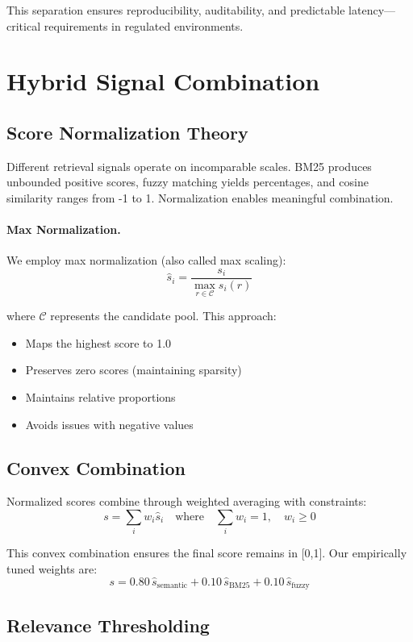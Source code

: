 This separation ensures reproducibility, auditability, and predictable latency—critical requirements in regulated environments.

\section{Hybrid Signal Combination}

\subsection{Score Normalization Theory}

Different retrieval signals operate on incomparable scales. BM25 produces unbounded positive scores, fuzzy matching yields percentages, and cosine similarity ranges from -1 to 1. Normalization enables meaningful combination.

\paragraph{Max Normalization.} We employ max normalization (also called max scaling):
\[
\widehat{s}_i = \frac{s_i}{\max_{r \in \mathcal{C}} s_i(r)}
\]

where $\mathcal{C}$ represents the candidate pool. This approach:
\begin{itemize}[leftmargin=*,itemsep=2pt,topsep=2pt]
\item Maps the highest score to 1.0
\item Preserves zero scores (maintaining sparsity)
\item Maintains relative proportions
\item Avoids issues with negative values
\end{itemize}

\subsection{Convex Combination}

Normalized scores combine through weighted averaging with constraints:
\[
s = \sum_{i} w_i \widehat{s}_i \quad \text{where} \quad \sum_{i} w_i = 1, \quad w_i \geq 0
\]

This convex combination ensures the final score remains in [0,1]. Our empirically tuned weights are:
\[
\boxed{ \; s = 0.80\,\widehat{s}_{\text{semantic}} + 0.10\,\widehat{s}_{\text{BM25}} + 0.10\,\widehat{s}_{\text{fuzzy}} \; }
\]

\subsection{Relevance Thresholding}

